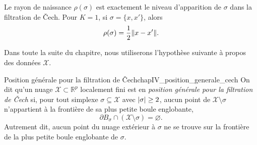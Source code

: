 Le rayon de naissance $\rho(\sigma)$ est exactement le niveau d'apparition de $\sigma$ dans la filtration de \v Cech. Pour $K=1$, si $\sigma=\{x,x'\}$, alors
\[
    \rho(\sigma)=\frac12\lVert x-x' \rVert.
\]

Dans toute la suite du chapitre, nous utiliserons l'hypothèse suivante à propos des données $\mathcal X$. %

\begin{Definition}{Position générale pour la filtration de \v Cech}{chapIV_position_generale_cech}
On dit qu'un nuage $\mathcal X\subset \mathbb R^p$ localement fini est en \emph{position générale pour la filtration de \v Cech} si, pour tout simplexe $\sigma\subseteq\mathcal X$ avec $\lvert \sigma \rvert \ge 2$,
aucun point de $\mathcal X\setminus\sigma$ n'appartient à la frontière de sa plus petite boule englobante,
    \[
        \partial B_\sigma\cap(\mathcal X\setminus\sigma)=\varnothing.
    \]
Autrement dit, aucun point du nuage extérieur à $\sigma$ ne se trouve sur
la frontière de la plus petite boule englobante de $\sigma$.
\end{Definition}


